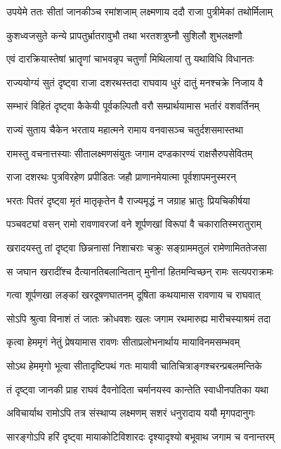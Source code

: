 \twolineshloka
{उपयेमे ततः सीतां जानकीञ्च रमांशजाम्}
{लक्ष्मणाय ददौ राजा पुत्रीमेकां तथोर्मिलाम्}%

\twolineshloka
{कुशध्वजसुते कन्ये प्रापतुर्भ्रातरावुभौ}
{तथा भरतशत्रुघ्नौ सुशिलौ शुभलक्षणौ}%

\twolineshloka
{एवं दारक्रियास्तेषां भ्रातॄणां चाभवन्नृप}
{चतुर्णां मिथिलायां तु यथाविधि विधानतः}%

\twolineshloka
{राज्ययोग्यं सुतं दृष्ट्वा राजा दशरथस्तदा}
{राघवाय धुरं दातुं मनश्चक्रे निजाय वै}%

\twolineshloka
{सम्भारं विहितं दृष्ट्वा कैकेयी पूर्वकल्पितौ}
{वरौ सम्प्रार्थयामास भर्तारं वशवर्तिनम्}%

\twolineshloka
{राज्यं सुताय चैकेन भरताय महात्मने}
{रामाय वनवासञ्च चतुर्दशसमास्तथा}%

\twolineshloka
{रामस्तु वचनात्तस्याः सीतालक्ष्मणसंयुतः}
{जगाम दण्डकारण्यं राक्षसैरुपसेवितम्}%

\twolineshloka
{राजा दशरथः पुत्रविरहेण प्रपीडितः}
{जहौ प्राणानमेयात्मा पूर्वशापमनुस्मरन्}%

\twolineshloka
{भरतः पितरं दृष्ट्वा मृतं मातृकृतेन वै}
{राज्यमृद्धं न जग्राह भ्रातुः प्रियचिकीर्षया}%

\twolineshloka
{पञ्चवट्यां वसन् रामो रावणावरजां वने}
{शूर्पणखां विरूपां वै चकारातिस्मरातुराम्}%

\twolineshloka
{खरादयस्तु तां दृष्ट्वा छिन्ननासां निशाचराः}
{चक्रुः सङ्ग्राममतुलं रामेणामिततेजसा}%

\twolineshloka
{स जघान खरादींश्च दैत्यानतिबलान्वितान्}
{मुनीनां हितमन्विच्छन् रामः सत्यपराक्रमः}%

\twolineshloka
{गत्वा शूर्पणखा लङ्कां खरदूषणघातनम्}
{दूषिता कथयामास रावणाय च राघवात्}%

\twolineshloka
{सोऽपि श्रुत्वा विनाशं तं जातः क्रोधवशः खलः}
{जगाम रथमारुह्य मारीचस्याश्रमं तदा}%

\twolineshloka
{कृत्वा हेममृगं नेतुं प्रेषयामास रावणः}
{सीताप्रलोभनार्थाय मायाविनमसम्भवम्}%

\twolineshloka
{सोऽथ हेममृगो भूत्वा सीतादृष्टिपथं गतः}
{मायावी चातिचित्राङ्गश्चरन्प्रबलमन्तिके}%

\twolineshloka
{तं दृष्ट्वा जानकी प्राह राघवं दैवनोदिता}
{चर्मानयस्व कान्तेति स्वाधीनपतिका यथा}%

\twolineshloka
{अविचार्याथ रामोऽपि तत्र संस्थाप्य लक्ष्मणम्}
{सशरं धनुरादाय ययौ मृगपदानुगः}%

\twolineshloka
{सारङ्गोऽपि हरिं दृष्ट्वा मायाकोटिविशारदः}
{दृश्यादृश्यो बभूवाथ जगाम च वनान्तरम्}%


